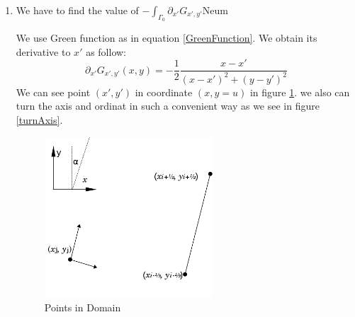\documentclass[a4paper,12pt]{article}
\newcommand{\integ}[3]{%
\ensuremath{\displaystyle{\int^{#2}_{#1} #3}}}
\begin{document}
\begin{enumerate}
 \item We have to find the value of $-\integ{\Gamma_0}{}{\partial_{x'} G_{x',y'} \text{Neum}}$

We use Green function as in equation \ref{GreenFunction}. We obtain its derivative to $x'$ as follow:
\begin{equation}
 \partial_{x'} G_{x',y'}(x,y)=-\frac{1}{2}\frac{x-x'}{(x-x')^2+(y-y')^2}
\end{equation}
We can see point $(x',y')$ in coordinate $(x,y=u)$ in figure \ref{PointsDomain}. we also can turn the axis and ordinat in such a convenient way as we see in figure \ref{turnAxis}. 
\begin{figure}[!htbp]
\begin{center}
\includegraphics[height = 6cm]{positionOfPoints.png}
\end{center}
 \caption{Points in Domain}\label{PointsDomain}
\end{figure}


\end{enumerate}
\end{document}
